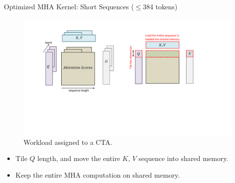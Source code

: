 \begin{frame}{Optimized MHA Kernel: Short Sequences ($\le$384 tokens)}
    \begin{figure}
        \centering
        \includegraphics[width=.4\textwidth]{./images/MHA-variable-seq-length.pdf}
        \caption{Workload assigned to a CTA.}
    \end{figure}

    \begin{itemize}
        \item Tile $Q$ length, and move the entire $K$, $V$ sequence into shared memory.
        \item Keep the entire MHA computation on shared memory.
    \end{itemize}
\end{frame}

